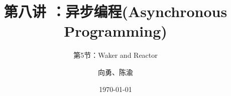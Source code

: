 


\title[第8讲]{第八讲 ：异步编程(Asynchronous Programming)} %
\subtitle{第5节：Waker and Reactor}
\author{向勇、陈渝} %
\date{\today} %



\begin{frame}
\titlepage %
\end{frame}


